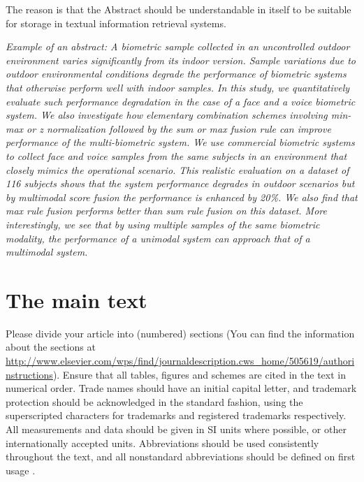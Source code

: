 \documentclass[times,referee,twocolumn,final,authoryear]{elsarticle}
\begin{document}
The reason is that the Abstract should be understandable in itself to
be suitable for storage in textual information retrieval systems.

\textit{Example of an abstract: A biometric sample collected in an
uncontrolled outdoor environment varies significantly from its
indoor version. Sample variations due to outdoor environmental
conditions degrade the performance of biometric systems that
otherwise perform well with indoor samples. In this study, we
quantitatively evaluate such performance degradation in the case
of a face and a voice biometric system. We also investigate how
elementary combination schemes involving min-max or z
normalization followed by the sum or max fusion rule can
improve performance of the multi-biometric system. We use
commercial biometric systems to collect face and voice samples
from the same subjects in an environment that closely mimics the
operational scenario. This realistic evaluation on a dataset of
116 subjects shows that the system performance degrades in
outdoor scenarios but by multimodal score fusion the
performance is enhanced by 20\%. We also find that max rule
fusion performs better than sum rule fusion on this dataset. More
interestingly, we see that by using multiple samples of the same
biometric modality, the performance of a unimodal system can
approach that of a multimodal system.}

\section{The main text}

Please divide your article into (numbered) sections (You can find the
information about the sections at
\url{http://www.elsevier.com/wps/find/journaldescription.cws_home/505619/authorinstructions}).
Ensure that all tables, figures and schemes are cited in the text in
numerical order. Trade names should have an initial capital letter, and
trademark protection should be acknowledged in the standard fashion,
using the superscripted characters for trademarks and registered
trademarks respectively. All measurements and data should be given in
SI units where possible, or other internationally accepted units.
Abbreviations should be used consistently throughout the text, and all
nonstandard abbreviations should be defined on first usage
\citep{vanderGeeretal2000}.
\end{document}
